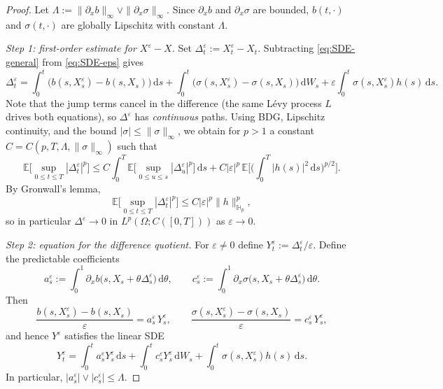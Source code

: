 \documentclass[11pt]{article}
\newcommand{\E}{\mathbb{E}}
\newcommand{\Hb}{\mathbb{H}}
\newcommand{\1}{\mathbf{1}}
\newcommand{\dd}{\mathrm{d}}
\theoremstyle{plain}
\theoremstyle{definition}
\theoremstyle{remark}
\begin{document}
\begin{proof}
Let $\Lambda:=\|\partial_x b\|_\infty\vee \|\partial_x\sigma\|_\infty$.
Since $\partial_x b$ and $\partial_x\sigma$ are bounded, $b(t,\cdot)$ and $\sigma(t,\cdot)$ are globally Lipschitz with constant $\Lambda$.

\medskip
\noindent\emph{Step 1: first-order estimate for $X^\varepsilon-X$.}
Set $\Delta_t^\varepsilon:=X_t^\varepsilon-X_t$. Subtracting \eqref{eq:SDE-general} from \eqref{eq:SDE-eps} gives
\[
\Delta_t^\varepsilon=\int_0^t\!\big(b(s,X_s^\varepsilon)-b(s,X_s)\big)\,\dd s
+\int_0^t\!\big(\sigma(s,X_s^\varepsilon)-\sigma(s,X_s)\big)\,\dd W_s
+\varepsilon\int_0^t \sigma(s,X_s^\varepsilon)h(s)\,\dd s.
\]
Note that the jump terms cancel in the difference (the same L\'evy process $L$ drives both equations), so $\Delta^\varepsilon$ has \emph{continuous}
paths.
Using BDG, Lipschitz continuity, and the bound $|\sigma|\le\|\sigma\|_\infty$, we obtain for $p>1$ a constant $C=C(p,T,\Lambda,\|\sigma\|_\infty)$ such that
\begin{equation}\label{eq:Delta-eps-bound}
\E\Big[\sup_{0\le t\le T}|\Delta_t^\varepsilon|^p\Big]
\le C\int_0^T \E\Big[\sup_{0\le u\le s}|\Delta_u^\varepsilon|^p\Big]\,\dd s
+C|\varepsilon|^p\,\E\Big[\Big(\int_0^T |h(s)|^2\,\dd s\Big)^{p/2}\Big].
\end{equation}
By Gronwall's lemma,
\begin{equation}
\E\Big[\sup_{0\le t\le T}|\Delta_t^\varepsilon|^p\Big]\le C|\varepsilon|^p\|h\|_{\Hb_p}^p,
\end{equation}
so in particular $\Delta^\varepsilon\to0$ in $L^p(\Omega;C([0,T]))$ as $\varepsilon\to0$.

\medskip
\noindent\emph{Step 2: equation for the difference quotient.}
For $\varepsilon\neq 0$ define $Y_t^\varepsilon:=\Delta_t^\varepsilon/\varepsilon$. Define the predictable coefficients
\[
a_s^\varepsilon:=\int_0^1 \partial_x b\big(s, X_s+\theta\Delta_s^\varepsilon\big)\,\dd\theta,
\qquad
c_s^\varepsilon:=\int_0^1 \partial_x \sigma\big(s, X_s+\theta\Delta_s^\varepsilon\big)\,\dd\theta.
\]
Then
\[
\frac{b(s,X_s^\varepsilon)-b(s,X_s)}{\varepsilon}=a_s^\varepsilon\,Y_s^\varepsilon,
\qquad
\frac{\sigma(s,X_s^\varepsilon)-\sigma(s,X_s)}{\varepsilon}=c_s^\varepsilon\,Y_s^\varepsilon,
\]
and hence $Y^\varepsilon$ satisfies the linear SDE
\begin{equation}\label{eq:Yeps}
Y_t^\varepsilon=\int_0^t a_s^\varepsilon Y_s^\varepsilon\,\dd s+\int_0^t c_s^\varepsilon Y_s^\varepsilon\,\dd W_s+\int_0^t \sigma(s,X_s^\varepsilon)h(s)\,\dd s.
\end{equation}
In particular, $|a_s^\varepsilon|\vee |c_s^\varepsilon|\le \Lambda$.


\end{proof}
\end{document}
